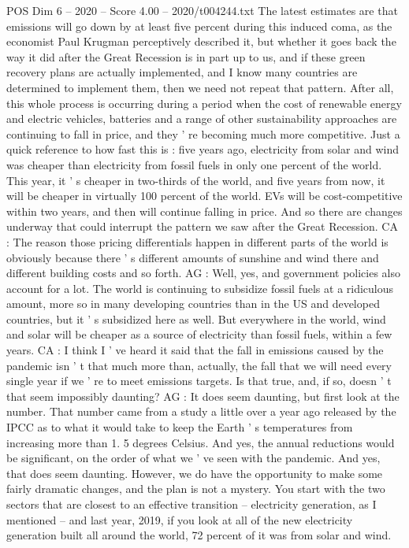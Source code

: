 \begin{textsample}{POS Dim 6 – 2020 – Score 4.00 – 2020/t004244.txt}
The latest estimates are that emissions will go down by at least five percent during this induced coma, as the economist Paul Krugman perceptively described it, but whether it goes back the way it did after the Great Recession is in part up to us, and if these green recovery plans are actually implemented, and I know many countries are determined to implement them, then we need not repeat that pattern.
After all, this whole process is occurring during a period when the cost of renewable energy and electric vehicles, batteries and a range of other sustainability approaches are continuing to fall in price, and they ' re becoming much more competitive.
Just a quick reference to how fast this is : five years ago, electricity from solar and wind was cheaper than electricity from fossil fuels in only one percent of the world.
This year, it ' s cheaper in two-thirds of the world, and five years from now, it will be cheaper in virtually 100 percent of the world.
EVs will be cost-competitive within two years, and then will continue falling in price.
And so there are changes underway that could interrupt the pattern we saw after the Great Recession.
CA : The reason those pricing differentials happen in different parts of the world is obviously because there ' s different amounts of sunshine and wind there and different building costs and so forth.
AG : Well, yes, and government policies also account for a lot.
The world is continuing to subsidize fossil fuels at a ridiculous amount, more so in many developing countries than in the US and developed countries, but it ' s subsidized here as well.
But everywhere in the world, wind and solar will be cheaper as a source of electricity than fossil fuels, within a few years.
CA : I think I ' ve heard it said that the fall in emissions caused by the pandemic isn ' t that much more than, actually, the fall that we will need every single year if we ' re to meet emissions targets.
Is that true, and, if so, doesn ' t that seem impossibly daunting?
AG : It does seem daunting, but first look at the number.
That number came from a study a little over a year ago released by the IPCC as to what it would take to keep the Earth ' s temperatures from increasing more than 1. 5 degrees Celsius.
And yes, the annual reductions would be significant, on the order of what we ' ve seen with the pandemic.
And yes, that does seem daunting.
However, we do have the opportunity to make some fairly dramatic changes, and the plan is not a mystery.
You start with the two sectors that are closest to an effective transition -- electricity generation, as I mentioned -- and last year, 2019, if you look at all of the new electricity generation built all around the world, 72 percent of it was from solar and wind.

\end{textsample}
